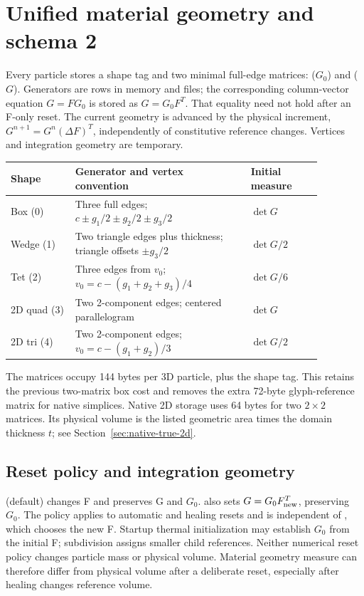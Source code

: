 \section{Unified material geometry and schema 2}
\label{sec:unified-particle-geometry}

Every particle stores a shape tag and two minimal full-edge matrices:
 ($G_0$) and
 ($G$). Generators are rows in memory and files;
the corresponding column-vector equation $G=F G_0$ is stored as $G=G_0F^T$.
That equality need not hold after an F-only reset. The current geometry is
advanced by the physical increment, $G^{n+1}=G^n(\Delta F)^T$, independently of
constitutive reference changes. Vertices and integration geometry are temporary.

\begin{center}\small
\begin{tabular}{@{}p{0.18\linewidth}p{0.49\linewidth}p{0.20\linewidth}@{}}
\toprule Shape & Generator and vertex convention & Initial measure\\\midrule
Box (0) & Three full edges; $c\pm g_1/2\pm g_2/2\pm g_3/2$ & $\det G$\\
Wedge (1) & Two triangle edges plus thickness; triangle offsets $\pm g_3/2$ & $\det G/2$\\
Tet (2) & Three edges from $v_0$; $v_0=c-(g_1+g_2+g_3)/4$ & $\det G/6$\\
2D quad (3) & Two 2-component edges; centered parallelogram & $\det G$\\
2D tri (4) & Two 2-component edges; $v_0=c-(g_1+g_2)/3$ & $\det G/2$\\
\bottomrule
\end{tabular}\end{center}

The matrices occupy 144 bytes per 3D particle, plus the shape tag. This retains
the previous two-matrix box cost and removes the extra 72-byte glyph-reference
matrix for native simplices. Native 2D storage uses 64 bytes for two
$2\times2$ matrices. Its physical volume is the listed geometric area times
the domain thickness $t$; see Section~\ref{sec:native-true-2d}.

\subsection{Reset policy and integration geometry}
 (default) changes F and preserves G and $G_0$.
 also sets $G=G_0F_{\rm new}^T$, preserving
$G_0$. The policy applies to automatic and healing resets and is independent of
, which chooses the new F. Startup thermal initialization
may establish $G_0$ from the initial F; subdivision assigns smaller child
references. Neither numerical reset policy changes particle mass or physical
volume. Material geometry measure can therefore differ from physical volume
after a deliberate reset, especially after healing changes reference volume.

